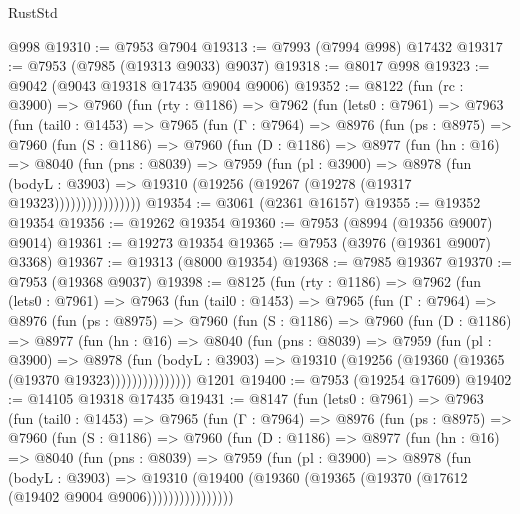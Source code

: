 \begin{lexlean}{RustStd}
\begin{coremodule}
    @998
@19310 := @7953 @7904
@19313 := @7993 (@7994 @998) @17432
@19317 := @7953 (@7985 (@19313 @9033) @9037)
@19318 := @8017 @998
@19323 := @9042 (@9043 @19318 @17435 @9004 @9006)
@19352 := @8122
    (fun (rc : @3900) =>
    @7960
      (fun (rty : @1186) =>
      @7962
        (fun (lets0 : @7961) =>
        @7963
          (fun (tail0 : @1453) =>
          @7965
            (fun (Γ : @7964) =>
            @8976
              (fun (ps : @8975) =>
              @7960
                (fun (S : @1186) =>
                @7960
                  (fun (D : @1186) =>
                  @8977
                    (fun (hn : @16) =>
                    @8040
                      (fun (pns : @8039) =>
                      @7959
                        (fun (pl : @3900) =>
                        @8978
                          (fun (bodyL : @3903) =>
                          @19310 (@19256 (@19267 (@19278 (@19317 @19323))))))))))))))))
@19354 := @3061 (@2361 @16157)
@19355 := @19352 @19354
@19356 := @19262 @19354
@19360 := @7953 (@8994 (@19356 @9007) @9014)
@19361 := @19273 @19354
@19365 := @7953 (@3976 (@19361 @9007) @3368)
@19367 := @19313 (@8000 @19354)
@19368 := @7985 @19367
@19370 := @7953 (@19368 @9037)
@19398 := @8125
    (fun (rty : @1186) =>
    @7962
      (fun (lets0 : @7961) =>
      @7963
        (fun (tail0 : @1453) =>
        @7965
          (fun (Γ : @7964) =>
          @8976
            (fun (ps : @8975) =>
            @7960
              (fun (S : @1186) =>
              @7960
                (fun (D : @1186) =>
                @8977
                  (fun (hn : @16) =>
                  @8040
                    (fun (pns : @8039) =>
                    @7959
                      (fun (pl : @3900) =>
                      @8978
                        (fun (bodyL : @3903) =>
                        @19310 (@19256 (@19360 (@19365 (@19370 @19323)))))))))))))))
    @1201
@19400 := @7953 (@19254 @17609)
@19402 := @14105 @19318 @17435
@19431 := @8147
    (fun (lets0 : @7961) =>
    @7963
      (fun (tail0 : @1453) =>
      @7965
        (fun (Γ : @7964) =>
        @8976
          (fun (ps : @8975) =>
          @7960
            (fun (S : @1186) =>
            @7960
              (fun (D : @1186) =>
              @8977
                (fun (hn : @16) =>
                @8040
                  (fun (pns : @8039) =>
                  @7959
                    (fun (pl : @3900) =>
                    @8978
                      (fun (bodyL : @3903) =>
                      @19310
                        (@19400 (@19360 (@19365 (@19370 (@17612 (@19402 @9004 @9006))))))))))))))))

\end{coremodule}
\end{lexlean}
